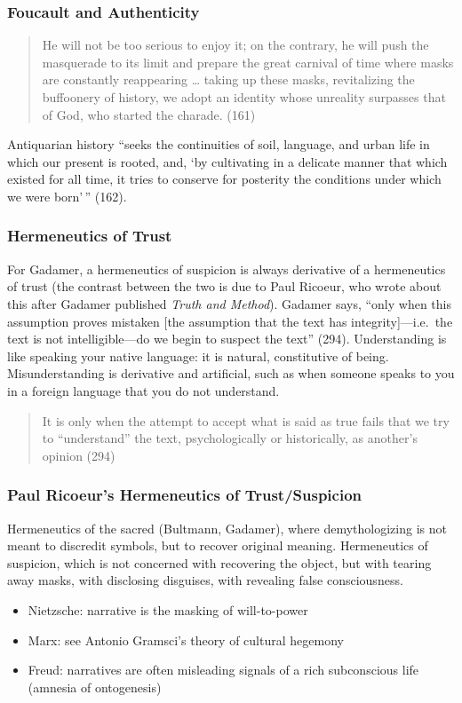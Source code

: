 \documentclass[xcolor=dvipsnames]{beamer}
\begin{document}
\begin{frame}
  \frametitle{Foucault and Authenticity}
  \begin{quote}
    He will not be too serious to enjoy it; on the contrary, he will
    push the masquerade to its limit and prepare the great carnival of
    time where masks are constantly reappearing {\ldots} taking up
    these masks, revitalizing the buffoonery of history, we adopt an
    identity whose unreality surpasses that of God, who started the
    charade. (161)
  \end{quote}
  Antiquarian history ``seeks the continuities of soil, language, and
  urban life in which our present is rooted, and, `by cultivating in a
  delicate manner that which existed for all time, it tries to
  conserve for posterity the conditions under which we were born'\,''
  (162).
\end{frame}

\begin{frame}
  \frametitle{Hermeneutics of Trust}
  For Gadamer, a hermeneutics of suspicion is always derivative of a
  hermeneutics of trust (the contrast between the two is due to Paul
  Ricoeur, who wrote about this after Gadamer published \emph{Truth
    and Method}). Gadamer says, ``only when this assumption proves
  mistaken [the assumption that the text has integrity]---i.e.\ the
  text is not intelligible---do we begin to suspect the text'' (294).
  Understanding is like speaking your native language: it is natural,
  constitutive of being. Misunderstanding is derivative and
  artificial, such as when someone speaks to you in a foreign language
  that you do not understand.
  \begin{quote}
    It is only when the attempt to accept what is said as true fails
    that we try to ``understand'' the text, psychologically or
    historically, as another's opinion (294)
  \end{quote}
\end{frame}

\begin{frame}
  \frametitle{Paul Ricoeur's Hermeneutics of Trust/Suspicion}
  \alert{Hermeneutics of the sacred} (Bultmann, Gadamer), where
  demythologizing is not meant to discredit symbols, but to recover
  original meaning. \alert{Hermeneutics of suspicion}, which is not
  concerned with recovering the object, but with tearing away masks,
  with disclosing disguises, with revealing false consciousness.
  \begin{itemize}
  \item Nietzsche: narrative is the masking of will-to-power
  \item Marx: see Antonio Gramsci's theory of cultural hegemony
  \item Freud: narratives are often misleading signals of a rich
    subconscious life (amnesia of ontogenesis)
  \end{itemize}
\end{frame}
\end{document}

